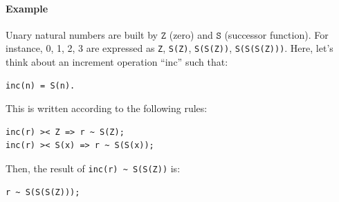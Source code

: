 \paragraph{Example}
Unary natural numbers are built by $\texttt{Z}$ (zero) and $\texttt{S}$ (successor function). For
instance, 0, 1, 2, 3 are expressed as \texttt{Z}, \texttt{S(Z)}, \texttt{S(S(Z))}, \texttt{S(S(S(Z)))}. Here, let's think about an
increment operation ``inc'' such that:
\begin{small}
\begin{verbatim}
inc(n) = S(n).
\end{verbatim}
\end{small}
This is written according to the following rules:
\begin{small}
\begin{verbatim}
inc(r) >< Z => r ~ S(Z);
inc(r) >< S(x) => r ~ S(S(x));
\end{verbatim}
\end{small}
Then, the result of \texttt{inc(r) \~{} S(S(Z))} is:
\begin{small}
\begin{verbatim}
r ~ S(S(S(Z)));
\end{verbatim}
\end{small}
